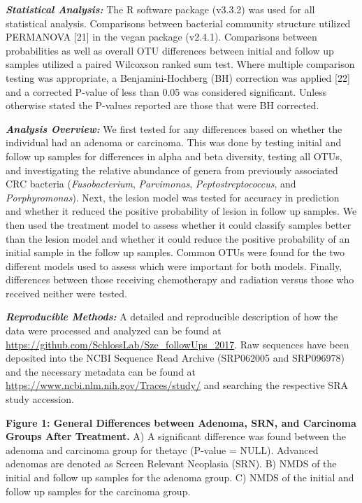 \documentclass[12pt,]{article}
\begin{document}
\textbf{\emph{Statistical Analysis:}} The R software package (v3.3.2)
was used for all statistical analysis. Comparisons between bacterial
community structure utilized PERMANOVA {[}21{]} in the vegan package
(v2.4.1). Comparisons between probabilities as well as overall OTU
differences between initial and follow up samples utilized a paired
Wilcoxson ranked sum test. Where multiple comparison testing was
appropriate, a Benjamini-Hochberg (BH) correction was applied {[}22{]}
and a corrected P-value of less than 0.05 was considered significant.
Unless otherwise stated the P-values reported are those that were BH
corrected.

\textbf{\emph{Analysis Overview:}} We first tested for any differences
based on whether the individual had an adenoma or carcinoma. This was
done by testing initial and follow up samples for differences in alpha
and beta diversity, testing all OTUs, and investigating the relative
abundance of genera from previously associated CRC bacteria
(\emph{Fusobacterium}, \emph{Parvimonas}, \emph{Peptostreptococcus}, and
\emph{Porphyromonas}). Next, the lesion model was tested for accuracy in
prediction and whether it reduced the positive probability of lesion in
follow up samples. We then used the treatment model to assess whether it
could classify samples better than the lesion model and whether it could
reduce the positive probability of an initial sample in the follow up
samples. Common OTUs were found for the two different models used to
assess which were important for both models. Finally, differences
between those receiving chemotherapy and radiation versus those who
received neither were tested.

\textbf{\emph{Reproducible Methods:}} A detailed and reproducible
description of how the data were processed and analyzed can be found at
\url{https://github.com/SchlossLab/Sze_followUps_2017}. Raw sequences
have been deposited into the NCBI Sequence Read Archive (SRP062005 and
SRP096978) and the necessary metadata can be found at
\url{https://www.ncbi.nlm.nih.gov/Traces/study/} and searching the
respective SRA study accession.

\newpage

\textbf{Figure 1: General Differences between Adenoma, SRN, and
Carcinoma Groups After Treatment.} A) A significant difference was found
between the adenoma and carcinoma group for thetayc (P-value = NULL).
Advanced adenomas are denoted as Screen Relevant Neoplasia (SRN). B)
NMDS of the initial and follow up samples for the adenoma group. C) NMDS
of the initial and follow up samples for the carcinoma group.
\end{document}
